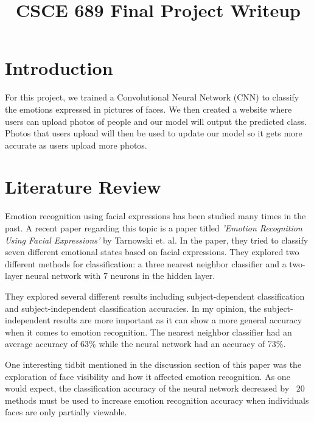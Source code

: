 \documentclass[conference]{IEEEtran}
\begin{document}
\title{CSCE 689 Final Project Writeup}

\author{ 
\and
{} 
}

\maketitle

\section{Introduction}
For this project, we trained a Convolutional Neural Network (CNN) to classify the 
emotions expressed in pictures of faces. We then created a website where users can upload 
photos of people and our model will output the predicted class. Photos that users upload 
will then be used to update our model so it gets more accurate as users upload more 
photos. 

\section{Literature Review}
Emotion recognition using facial expressions has been studied many times in the past. A 
recent paper regarding this topic is a paper titled \textit{'Emotion Recognition Using 
Facial 
Expressions'} by Tarnowski et. al. In the paper, they tried to classify seven different 
emotional states based on facial expressions. They explored two different methods for 
classification: a three nearest neighbor classifier and a two-layer neural network with 7 
neurons in the hidden layer.

They explored several different results including subject-dependent classification and 
subject-independent classification accuracies. In my opinion, the subject-independent 
results are more important as it can show a more general accuracy when it comes to 
emotion recognition. The nearest neighbor classifier had an average accuracy of 63\% while 
the neural network had an accuracy of 73\%.

One interesting tidbit mentioned in the discussion section of this paper was the 
exploration of face visibility and how it affected emotion recognition. As one would 
expect, the classification accuracy of the neural network decreased by ~20%
methods must be used to increase emotion recognition accuracy when individuals faces are 
only partially viewable.
\end{document}
